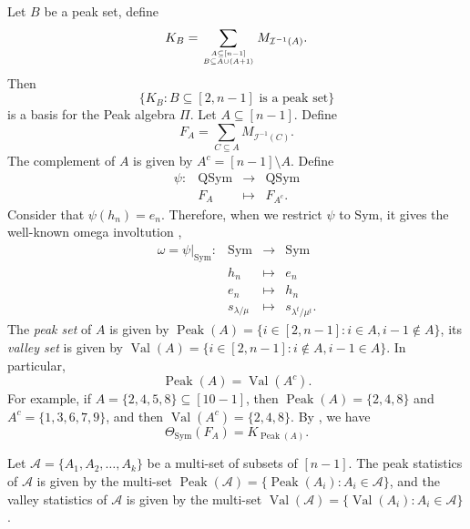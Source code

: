 \documentclass[12pt]{amsart}
\numberwithin{equation}{section}
\newcommand{\QSym}{\mathrm{QSym}}
\newcommand{\Sym}{\mathrm{Sym}}
\begin{document}
Let $B$ be a peak set, define
$$K_{B}=\sum_{A\subseteq [n-1]\atop B\subseteq A \cup (A+1)}M_{\mathcal{I}^{-1}(A)}.$$
Then $$\{ K_B: B\subseteq [2,n-1] \text{~is a peak set} \}$$ is a basis for the Peak algebra $\Pi$. Let $A\subseteq [n-1]$. Define 
$$F_A = \sum_{C\subseteq A} M_{\mathcal{I}^{-1}(C)}.$$
The complement of $A$ is given by $A^c=[n-1]\setminus A$. Define
$$
\begin{array}{cccc}
\psi: &\QSym& \rightarrow& \QSym\\
& F_A & \mapsto & F_{A^c}.
\end{array}
$$
Consider that $\psi(h_n)=e_n$. Therefore, when we restrict $\psi$ to $\Sym$, it gives the well-known omega involtution \cite[Equation (2. 4.15) ]{G18}, 
$$
\begin{array}{cccc}
\omega=\psi|_{\Sym}: &\Sym& \rightarrow& \Sym\\
& h_n & \mapsto & e_n \\
& e_n & \mapsto & h_n \\
& s_{\lambda/\mu} & \mapsto & s_{\lambda^t/\mu^t}. 
\end{array}
$$
The \emph{peak set} of $A$ is given by $\operatorname{Peak}(A) = \{i \in [2, n-1] : i \in A, i-1 \notin A\}$, its \emph{valley set} is given by $\operatorname{Val}(A) = \{i \in [2, n-1] : i \notin A, i-1 \in A\}$. In particular,
\[
\operatorname{Peak}(A) = \operatorname{Val}(A^c).
\]
For example, if $A=\{2,4,5,8\}\subseteq [10-1]$, then $\operatorname{Peak}(A)=\{2,4,8\}$ and $A^c=\{1,3,6,7,9\}$, and then $ \operatorname{Val}(A^c)=\{2,4,8\}$.
By  \cite[Equation (9.1)]{A25}, we have
\begin{equation}
\Theta_{\Sym}(F_A) = K_{\operatorname{Peak}(A)}.
\end{equation}


Let $\mathcal{A} = \{A_1, A_2, \ldots, A_k\}$ be a multi-set of subsets of  $[n-1]$. The {peak statistics} of $\mathcal{A}$ is given by the multi-set $\operatorname{Peak}(\mathcal{A}) = \{\operatorname{Peak}(A_i) : A_i \in \mathcal{A}\}$, and the {valley statistics} of $\mathcal{A}$ is given by the multi-set $\operatorname{Val}(\mathcal{A}) = \{\operatorname{Val}(A_i) : A_i \in \mathcal{A}\}$.
\end{document}
